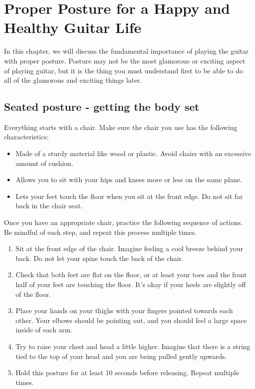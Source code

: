 \chapter[All About Posture]{Proper Posture for a Happy and Healthy Guitar Life}

In this chapter, we will discuss the fundamental importance of playing the guitar with proper posture. Posture may not be the most glamorous or exciting aspect of playing guitar, but it is the thing you must understand first to be able to do all of the glamorous and exciting things later.

\section{Seated posture - getting the body set}

Everything starts with a chair. Make sure the chair you use has the following characteristics:

\begin{itemize}
	
	\item Made of a sturdy material like wood or plastic. Avoid chairs with an excessive amount of cushion.
	
	\item Allows you to sit with your hips and knees more or less on the same plane.
	
	\item Lets your feet touch the floor when you sit at the front edge. Do not sit far back in the chair seat. 
	
\end{itemize}  

Once you have an appropriate chair, practice the following sequence of actions. Be mindful of each step, and repeat this process multiple times.

\begin{enumerate}
	
	\item Sit at the front edge of the chair. Imagine feeling a cool breeze behind your back. Do not let your spine touch the back of the chair.
	
	\item Check that both feet are flat on the floor, or at least your toes and the front half of your feet are touching the floor. It's okay if your heels are slightly off of the floor.
	
	\item Place your hands on your thighs with your fingers pointed towards each other. Your elbows should be pointing out, and you should feel a large space inside of each arm.
	
	\item Try to raise your chest and head a little higher. Imagine that there is a string tied to the top of your head and you are being pulled gently upwards.
	
	\item Hold this posture for at least 10 seconds before releasing. Repeat multiple times. 
	
\end{enumerate}

